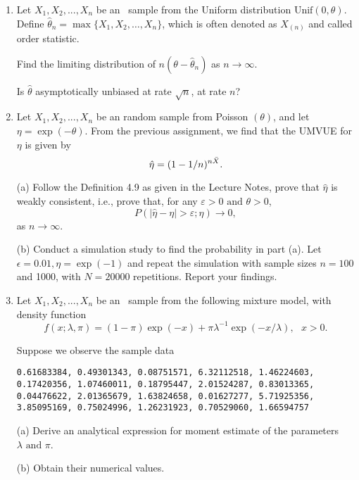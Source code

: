 \begin{enumerate}
\item 
Let $ X_{1}, X_{2}, ... , X_{n} $ be an \iid\ sample from the Uniform distribution $ \mathrm{Unif} (0, \theta) $. 
Define $ \hat \theta_{n} = \max \{ X_{1}, X_{2}, \ldots, X_{n} \} $, 
which is often denoted as $ X_{ (n) } $ and called order statistic.  

Find the limiting distribution of $ n ( \theta - \hat \theta_{n} ) $ as $ n \to \infty $. 

Is $\hat \theta$ asymptotically unbiased at rate $\sqrt{n}$, at rate $n$?


\item 
Let $ X_{1}, X_{2}, ... , X_{n} $ be an \iid random sample from 
Poisson $ (\theta) $, and let $ \eta = \exp ( - \theta ) $. 
From the previous assignment, we find that the UMVUE for $ \eta $ is given by 
\[ 
\hat \eta = (1 - 1/n)^{ n \bar X }. \\ 
\] 

(a) Follow the Definition 4.9 as given in the Lecture Notes, 
prove that $ \hat \eta $ is weakly consistent, i.e., prove that, for any $ \varepsilon > 0 \text { and } \theta > 0 $, 
\[ 
P ( | \hat \eta - \eta | > \varepsilon; \eta ) \to 0, 
\] 
as $ n \to \infty $. 

(b) Conduct a simulation study to find the probability in part (a). 
Let $\epsilon = 0.01, \eta = \exp(-1)$ and repeat
the simulation with sample sizes $n=100$ and 1000, with $N=20000$
repetitions.
Report your findings. 


\item
Let  $ X_{1}, X_{2}, ... , X_{n} $ be an \iid\ sample 
from the following mixture model, with density function 
\[ 
f(x; \lambda, \pi) 
= (1 - \pi) \exp( - x ) + \pi \lambda^{ - 1 } \exp ( - x/\lambda ), 
~~~ x > 0. 
\]  

Suppose we observe the sample data 

\begin{verbatim}
0.61683384, 0.49301343, 0.08751571, 6.32112518, 1.46224603, 
0.17420356, 1.07460011, 0.18795447, 2.01524287, 0.83013365, 
0.04476622, 2.01365679, 1.63824658, 0.01627277, 5.71925356, 
3.85095169, 0.75024996, 1.26231923, 0.70529060, 1.66594757
\end{verbatim}

(a)
Derive an analytical expression for moment estimate of  
the parameters $ \lambda \text { and } \pi $.

(b)  Obtain their numerical values.




\end{enumerate}
